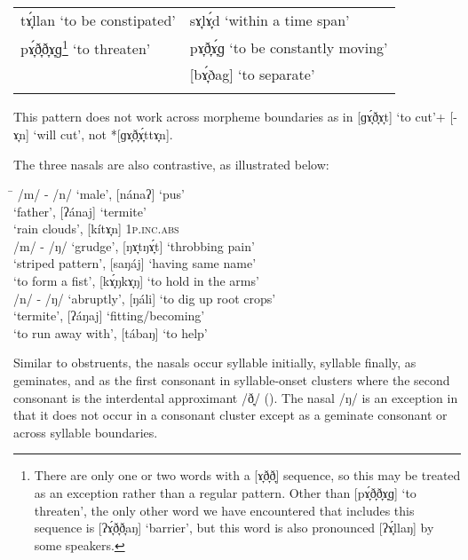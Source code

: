 \begin{table}
\begin{tabularx}{\textwidth}{QQ}
{}tɤ̞́llan ‘to be constipated’ &
sɤ̞lɤ̞́d ‘within a time span’ \\
\tablevspace
{}pɤ̞́ð̞ð̞ɤ̞ɡ\footnote{There are only one or two words with a [ɤ̞ð̞ð̞] sequence, so this may be treated as an exception rather than a regular pattern. Other than [pɤ̞́ð̞ð̞ɤ̞ɡ] ‘to threaten’, the only other word we have encountered that includes this sequence is [ʔɤ̞́ð̞ð̞aŋ] ‘barrier’, but this word is also pronounced [ʔɤ̞́llaŋ] by some speakers.} ‘to threaten’ &
pɤ̞ð̞ɤ̞́ɡ ‘to be constantly moving' \\
\tablevspace
& [bɤ̞́ðag] ‘to separate’ \\
\lspbottomrule
\end{tabularx}
\end{table}

This pattern does not work across morpheme boundaries as in [ɡɤ̞́ð̞ɤ̞t] ‘to cut’+ [-ɤ̞n] \rightarrow [ɡɤ̞ð̞ɤ̞́tɤ̞n] ‘will cut’, not *[ɡɤ̞ð̞ɤ̞́ttɤ̞n].

The three nasals
 are also contrastive, as illustrated below:

\ea
\begin{tabbing}
\hspace{1.3cm} \= \kill
/m/ - /n/ \> [máma] ‘male’, [nánaʔ] ‘pus’ \\
\>     [ʔámaj] ‘father’, [ʔánaj] ‘termite’ \\
\>     [ʔítɤ̞m] ‘rain clouds’, [kítɤ̞n] 1\textsc{p.inc.abs} \\
/m/ - /ŋ/ \> [mɤ̞́tmɤ̞t] ‘grudge’, [ŋɤ̞tŋɤ̞́t] ‘throbbing pain’ \\
\>     [samáj] ‘striped pattern’, [saŋáj] ‘having same name’ \\
\>   [kɤ̞́mkɤ̞m] ‘to form a fist’, [kɤ̞́ŋkɤ̞ŋ] ‘to hold in the arms’ \\
/n/ - /ŋ/  \>  [nálɪʔ] ‘abruptly’, [ŋáli] ‘to dig up root crops’ \\
\>     [ʔánaj] ‘termite’, [ʔáŋaj] ‘fitting/becoming’ \\
\>     [tában] ‘to run away with’, [tábaŋ] ‘to help’
\end{tabbing}
\z

Similar to obstruents, the nasals occur syllable initially, syllable finally, as geminates, and as the first consonant in syllable-onset clusters where the second consonant is the interdental approximant /ð̞/ (). The nasal /ŋ/ is an exception in that it does not occur in a consonant cluster except as a geminate consonant or across syllable boundaries.


